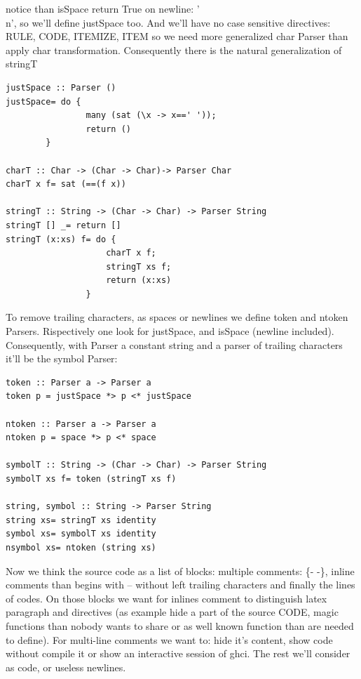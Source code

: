 \documentclass[a4papert]{article}
\begin{document}
notice than isSpace return True on newline: '\\n', so we'll define justSpace too. And we'll have no case sensitive directives: RULE, CODE, ITEMIZE, ITEM so we need more generalized char Parser than apply char transformation. Consequently there is the natural generalization of stringT

\begin{lstlisting}[style=haskellstyle]
justSpace :: Parser ()
justSpace= do {
                many (sat (\x -> x==' '));
                return ()
        }

charT :: Char -> (Char -> Char)-> Parser Char
charT x f= sat (==(f x))

stringT :: String -> (Char -> Char) -> Parser String
stringT [] _= return []
stringT (x:xs) f= do {
                    charT x f;
                    stringT xs f;
                    return (x:xs)
                }

\end{lstlisting}
To remove trailing characters, as spaces or newlines we define token and ntoken Parsers. Rispectively one look for justSpace, and isSpace (newline included). Consequently, with Parser a constant string and a parser of trailing characters it'll be the symbol Parser: 

\begin{lstlisting}[style=haskellstyle]
token :: Parser a -> Parser a
token p = justSpace *> p <* justSpace

ntoken :: Parser a -> Parser a
ntoken p = space *> p <* space

symbolT :: String -> (Char -> Char) -> Parser String
symbolT xs f= token (stringT xs f)

string, symbol :: String -> Parser String
string xs= stringT xs identity
symbol xs= symbolT xs identity
nsymbol xs= ntoken (string xs)

\end{lstlisting}
Now we think the source code as a list of blocks: multiple comments: \{- -\}, inline comments than begins with -- without left trailing characters and finally the lines of codes. On those blocks we want for inlines comment to distinguish latex paragraph and directives (as example hide a part of the source CODE, magic functions than nobody wants to share or as well known function than are needed to define). For multi-line comments we want to: hide it's content, show code without compile it or show an interactive session of ghci. The rest we'll consider as code, or useless newlines.
\end{document}
